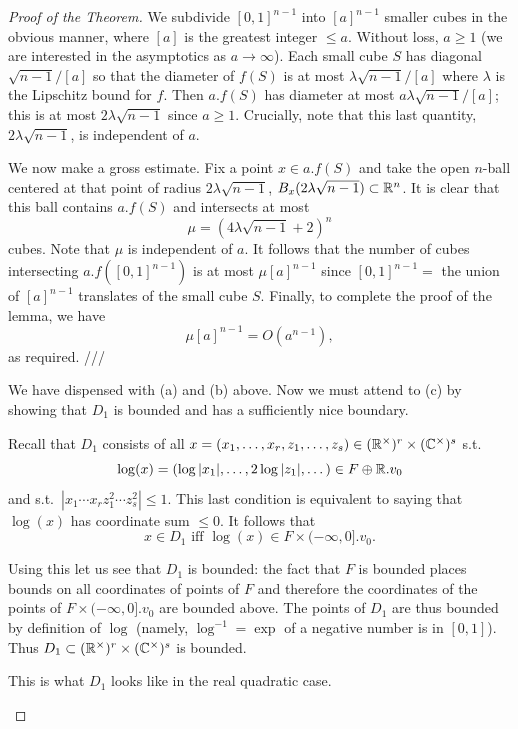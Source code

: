 \documentclass[10pt,a4paper,reqno]{amsart}
\begin{document}
\begin{proof}[Proof of the Theorem]
We subdivide $[0,1]^{n-1}$ into $[a]^{n-1}$ smaller cubes in the obvious
manner, where $[a]$ is the greatest integer $\le a.$ Without loss, $a \ge 1$
(we are interested in the asymptotics as $a\rightarrow \infty$). Each small
cube $S$ has diagonal $\sqrt{n-1}/[a]$ so that the diameter of $f(S)$ is at
most $\lambda\sqrt{n-1}/[a]$ where $\lambda$ is the Lipschitz bound for $f$.
Then $a.f(S)$ has diameter at most $a\lambda\sqrt{n-1}/[a]$; this is at most
$2\lambda\sqrt{n-1}$ since $a\ge 1$. Crucially, note that this last quantity,
$2\lambda\sqrt{n-1}$, is independent of $a$.

We now make a gross estimate. Fix a point $x\in a.f(S)$ and take the open
$n$-ball centered at that point of radius $2\lambda\sqrt{n-1}$,
$B_x(2\lambda\sqrt{n-1}) \subset \mathbb{R}^n$. It is clear that this ball contains
$a.f(S)$ and intersects at most \[\mu = (4\lambda\sqrt{n-1}+2)^n\] cubes. Note
that $\mu$ is independent of $a$. It follows that the number of cubes
intersecting $a.f([0,1]^{n-1})$ is at most $\mu[a]^{n-1}$ since $[0,1]^{n-1} =
$ the union of $[a]^{n-1}$ translates of the small cube $S$. Finally, to
complete the proof of the lemma, we have \[\mu[a]^{n-1} = O(a^{n-1}),\] as
required. ///

We have dispensed with (a) and (b) above. Now we must attend to (c) by showing
that $D_1$ is bounded and has a sufficiently nice boundary.

Recall that $D_1$ consists of all $x = (x_1,\dots,x_r,z_1,\dots,z_s) \in
(\mathbb{R}^\times)^r \times (\mathbb{C}^\times)^s$ s.t. \[\log(x) = (\log|x_1| , \dots,
2\log|z_1| , \dots) \in F\oplus \mathbb{R}.v_0\] and s.t.~$|x_1\cdots x_r z_1^2 \cdots
z_s^2| \le 1.$ This last condition is equivalent to saying that $\log(x)$ has
coordinate sum $\le 0.$ It follows that \[x\in D_1 \text{ iff } \log(x) \in F
\times (-\infty,0].v_0.\]

Using this let us see that $D_1$ is bounded: the fact that $F$ is bounded
places bounds on all coordinates of points of $F$ and therefore the coordinates
of the points of $F \times (-\infty,0].v_0$ are bounded above. The points of
$D_1$ are thus bounded by definition of $\log$ (namely, $\log^{-1}= \exp$ of a
negative number is in $[0,1]$). Thus $D_1 \subset (\mathbb{R}^\times)^r \times
(\mathbb{C}^\times)^s $ is bounded.

This is what $D_1$ looks like in the real quadratic case.

\begin{center}
\end{center}


\end{proof}
\end{document}
